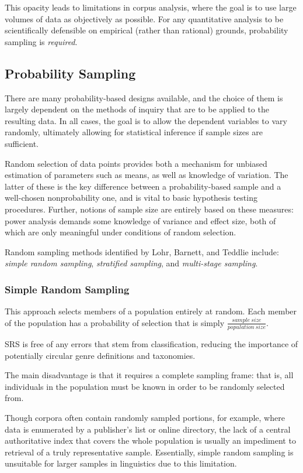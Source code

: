 This opacity leads to limitations in corpus analysis, where the goal is to use large volumes of data as objectively as possible.  For any quantitative analysis to be scientifically defensible on empirical (rather than rational) grounds, probability sampling is \textsl{required}.




\subsection{Probability Sampling}
There are many probability-based designs available, and the choice of them is largely dependent on the methods of inquiry that are to be applied to the resulting data.  In all cases, the goal is to allow the dependent variables to vary randomly, ultimately allowing for statistical inference if sample sizes are sufficient.

Random selection of data points provides both a mechanism for unbiased estimation of parameters such as means, as well as knowledge of variation.  The latter of these is the key difference between a probability-based sample and a well-chosen nonprobability one, and is vital to basic hypothesis testing procedures.  Further, notions of sample size are entirely based on these measures: power analysis demands some knowledge of variance and effect size, both of which are only meaningful under conditions of random selection.

Random sampling methods identified by Lohr, Barnett, and Teddlie\cite{lohr2009sampling,barnett1991sample,Teddlie01012007} include: \textsl{simple random sampling}, \textsl{stratified sampling}, and \textsl{multi-stage sampling}.

\subsubsection{Simple Random Sampling}
This approach selects members of a population entirely at random.  Each member of the population has a probability of selection that is simply $\frac{sample~size}{population~size}$.

SRS is free of any errors that stem from classification, reducing the importance of potentially circular genre definitions and taxonomies.

The main disadvantage is that it requires a complete sampling frame: that is, all individuals in the population must be known in order to be randomly selected from.

Though corpora often contain randomly sampled portions, for example, where data is enumerated by a publisher's list or online directory, the lack of a central authoritative index that covers the whole population is usually an impediment to retrieval of a truly representative sample.  Essentially, simple random sampling is unsuitable for larger samples in linguistics due to this limitation.

